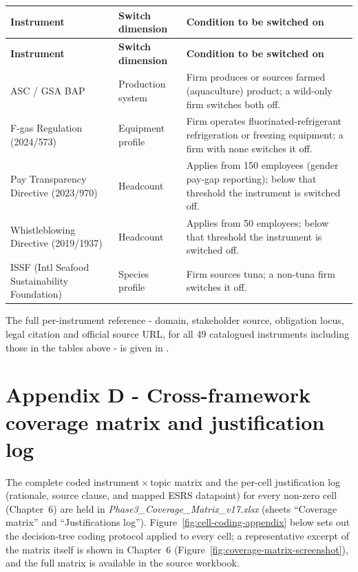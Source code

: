 \documentclass[
]{article}
\newcounter{none} %
\begin{document}
\begin{longtable}{@{}p{2.7cm}p{2.6cm}p{6.2cm}@{}}
\toprule
\textbf{Instrument} & \textbf{Switch dimension} & \textbf{Condition to be switched on} \\
\midrule
\endfirsthead
\toprule
\textbf{Instrument} & \textbf{Switch dimension} & \textbf{Condition to be switched on} \\
\midrule
\endhead
\bottomrule
\endfoot
ASC / GSA BAP & Production system & Firm produces or sources farmed (aquaculture) product; a wild-only firm switches both off. \\
F-gas Regulation (2024/573) & Equipment profile & Firm operates fluorinated-refrigerant refrigeration or freezing equipment; a firm with none switches it off. \\
Pay Transparency Directive (2023/970) & Headcount & Applies from 150 employees (gender pay-gap reporting); below that threshold the instrument is switched off. \\
Whistleblowing Directive (2019/1937) & Headcount & Applies from 50 employees; below that threshold the instrument is switched off. \\
ISSF (Intl Seafood Sustainability Foundation) & Species profile & Firm sources tuna; a non-tuna firm switches it off. \\
\end{longtable}

The full per-instrument reference - domain, stakeholder source, obligation
locus, legal citation and official source URL, for all 49 catalogued
instruments including those in the tables above - is given in
.

\section*{Appendix D - Cross-framework coverage matrix and justification log}\label{app:matrix}
The complete coded instrument\,$\times$\,topic matrix and
the per-cell justification log (rationale, source clause, and mapped ESRS
datapoint) for every non-zero cell (Chapter~6) are held in
\emph{Phase3\_Coverage\_Matrix\_v17.xlsx} (sheets ``Coverage matrix'' and
``Justifications log''). Figure~\ref{fig:cell-coding-appendix} below sets out
the decision-tree coding protocol applied to every cell; a representative
excerpt of the matrix itself is shown in Chapter~6
(Figure~\ref{fig:coverage-matrix-screenshot}), and the full matrix is
available in the source workbook.
\end{document}
